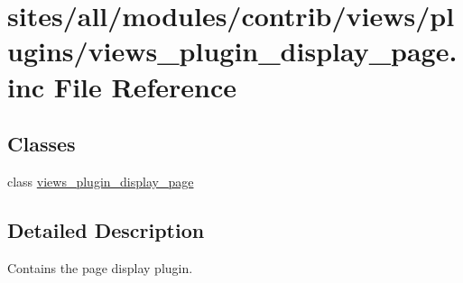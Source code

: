 \hypertarget{views__plugin__display__page_8inc}{
\section{sites/all/modules/contrib/views/plugins/views\_\-plugin\_\-display\_\-page.inc File Reference}
\label{views__plugin__display__page_8inc}
}
\subsection*{Classes}
\begin{CompactItemize}
\item 
class \hyperlink{classviews__plugin__display__page}{views\_\-plugin\_\-display\_\-page}
\end{CompactItemize}


\subsection{Detailed Description}
Contains the page display plugin. 